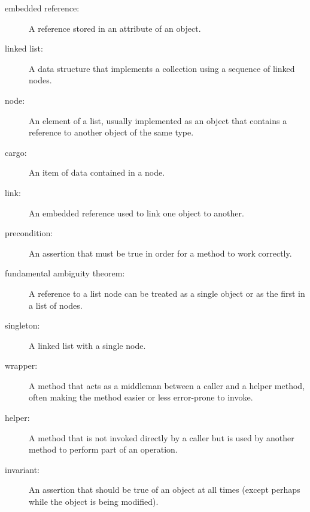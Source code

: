 \begin{description}

\item[embedded reference:] A reference stored in an attribute of
an object.

\item[linked list:] A data structure that implements a collection using
a sequence of linked nodes.

\item[node:] An element of a list, usually implemented as an object
that contains a reference to another object of the same type.

\item[cargo:] An item of data contained in a node.

\item[link:] An embedded reference used to link one object to
another.

\item[precondition:] An assertion that must be true in order for a
method to work correctly.

\item[fundamental ambiguity theorem:] A reference to a list
node can be treated as a single
object or as the first in a list of nodes.

\item[singleton:] A linked list with a single node.

\item[wrapper:] A method that acts as a middleman between a
caller and a helper method, often making the method easier or
less error-prone to invoke.

\item[helper:] A method that is not invoked directly by a caller
but is used by another method to perform part of an operation.

\item[invariant:] An assertion that should be true of an object at
all times (except perhaps while the object is being modified).

\end{description}

